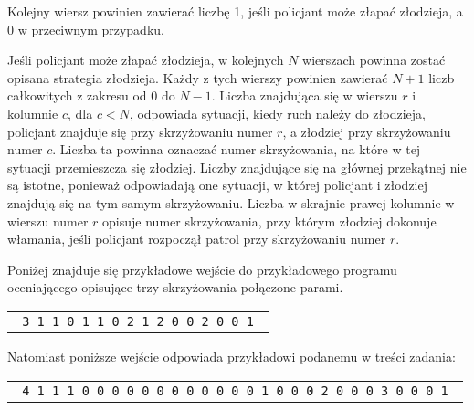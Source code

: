 \documentclass{boi2014-pl}
\begin{document}
    Kolejny wiersz powinien zawierać liczbę 1, jeśli policjant może złapać złodzieja,
    a 0 w przeciwnym przypadku.

    Jeśli policjant może złapać złodzieja, w kolejnych $N$ wierszach powinna zostać
    opisana strategia złodzieja.
    Każdy z tych wierszy powinien zawierać 
    $N+1$ liczb całkowitych z zakresu od 0 do $N-1$.
    Liczba znajdująca się w wierszu $r$ i kolumnie $c$, dla $c < N$,
    odpowiada sytuacji, kiedy ruch należy do złodzieja, policjant
    znajduje się przy skrzyżowaniu numer $r$, a złodziej przy skrzyżowaniu numer $c$.
    Liczba ta powinna oznaczać numer skrzyżowania, na które w tej sytuacji
    przemieszcza się złodziej.
    Liczby znajdujące się na głównej przekątnej nie są istotne, ponieważ odpowiadają one
    sytuacji, w której policjant i złodziej znajdują się na tym samym skrzyżowaniu.
    Liczba w skrajnie prawej kolumnie w wierszu numer $r$ opisuje numer skrzyżowania, przy którym
    złodziej dokonuje włamania, jeśli policjant rozpoczął patrol przy skrzyżowaniu numer $r$.

    Poniżej znajduje się przykładowe wejście do przykładowego programu oceniającego
    opisujące trzy skrzyżowania połączone parami.

    \begin{center}
        \begin{tabular}{p{4cm}}
            {\tt
                3 \newline
                0 1 1 \newline
                1 0 1 \newline
                1 1 0 \newline
                1 \newline
                0 2 1 2 \newline
                2 0 0 2 \newline
                1 0 0 1 \newline
            }
        \end{tabular}
    \end{center}

    Natomiast poniższe wejście odpowiada przykładowi podanemu w treści zadania:

    \begin{center}
        \begin{tabular}{p{4cm}}
            {\tt
                4 \newline
                0 1 1 1 \newline
                1 0 0 0 \newline
                1 0 0 0 \newline
                1 0 0 0 \newline
                1 \newline
                0 0 0 0 1 \newline
                2 0 0 0 2 \newline
                3 0 0 0 3 \newline
                1 0 0 0 1 \newline
            }
        \end{tabular}
    \end{center}
\end{document}
